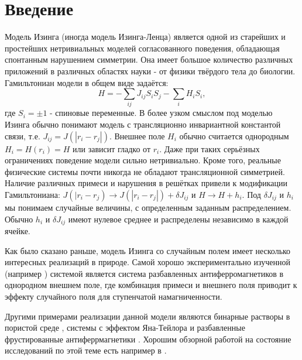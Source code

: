 \section{Введение}
	Модель Изинга (иногда модель Изинга-Ленца)  является одной из старейших и простейших нетривиальных моделей согласованного поведения, обладающая спонтанным нарушением симметрии. Она имеет большое количество различных приложений в различных областях науки  - от физики твёрдого тела до биологии. Гамильтониан модели в общем виде задаётся:
	\[
		H = - \sum_{ij} J_{ij}	S_i S_j - \sum_{i} H_i S_i,
	\]
	где $S_i = \pm 1$ - спиновые переменные. В более узком смыслом под моделью Изинга обычно понимают модель с трансляционно инвариантной константой связи, т.е. $J_{ij} = J(|r_i - r_j|)$.
	 Внешнее поле $H_i$ обычно считается однородным $H_i = H(r_i) = H$ или зависит гладко от $r_i$.
	 Даже при таких серьёзных ограничениях поведение модели сильно нетривиально. Кроме того,  реальные физические системы почти никогда не обладают трансляционной симметрией.
	 Наличие различных примеси и нарушения в решётках привели к модификации Гамильтониана: $J(|r_i-r_j) \to J(|r_i-r_j|) + \delta J_{ij}$ и $H \to H + h_i$. Под $\delta J_{ij}$ и $h_i$  мы понимаем случайные величины, с определенным заданным распределением. Обычно $h_i$ и $\delta J_{ij}$ имеют нулевое среднее и распределены независимо в каждой ячейке.

	Как было сказано раньше, модель Изинга со случайным полем имеет несколько интересных реализаций в природе. Самой хорошо экспериментально изученной (например \cite{fishman}) системой является система разбавленных антиферромагнетиков  в однородном внешнем поле, где комбинация примеси и внешнего поля приводит к эффекту случайного поля для ступенчатой намагниченности.

	Другими примерами реализации данной модели являются бинарные растворы в пористой среде \cite{de1984liquid}, системы с эффектом Яна-Тейлора \cite{graham1987random} и разбавленные фрустированные антиферрмагнетики \cite{fernandez1988random}. Хорошим обзорной работой на состояние исследований по этой теме есть например в \cite{nattermann1998theory}.
